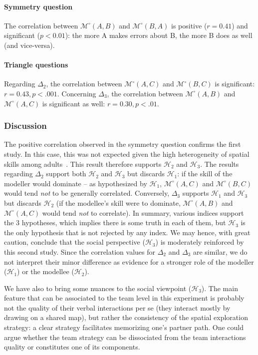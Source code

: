 \documentclass[natbib]{svjour3}
\newcommand{\A}{A\xspace}
\newcommand{\B}{B\xspace}
\newcommand{\gModel}[2]{{$\mathcal{M}^{\circ}(#1, #2)$}}
\begin{document}
\paragraph{Symmetry question} The correlation between \gModel{A}{B}  and
\gModel{B}{A}  is positive ($r = 0.41$) and significant ($p < 0.01$): the more \A
makes errors about \B, the more \B does as well (and vice-versa).

\paragraph{Triangle questions} Regarding $\Delta_2$, the correlation between
\gModel{A}{C} and \gModel{B}{C} is significant: $r=0.43, p <.001$. Concerning
$\Delta_3$, the correlation between \gModel{A}{B} and \gModel{A}{C} is
significant as well: $r=0.30, p <.01$.

\subsubsection*{Discussion}

The positive correlation observed in the symmetry question confirms the first
study.  In this case, this was not expected given the high heterogeneity of
spatial skills among adults~\citep{liben1981spatial}. This result therefore
supports  $\mathcal{H}_{2}$ and $\mathcal{H}_{3}$. The results regarding
$\Delta_2$ support both  $\mathcal{H}_{2}$ and  $\mathcal{H}_{3}$  but discards
$\mathcal{H}_{1}$: if the skill of the modeller would dominate -- as
hypothesized by $\mathcal{H}_{1}$, \gModel{A}{C}  and \gModel{B}{C} would tend
\emph{not} to be generally correlated.  Conversely, $\Delta_3$  supports
$\mathcal{H}_{1}$ and $\mathcal{H}_{3}$ but discards $\mathcal{H}_{2}$  (if the
modellee's skill were to dominate, \gModel{A}{B}  and \gModel{A}{C} would tend
\emph{not} to correlate). In summary, various indices support the 3 hypotheses,
which implies there is some truth in each of them, but $\mathcal{H}_{3}$ is the
only hypothesis that is not rejected by any index. We may hence, with great
caution, conclude that the social perspective ($\mathcal{H}_{3}$) is moderately
reinforced by this second study. Since the correlation values for $\Delta_2$ and
$\Delta_3$ are similar, we do not interpret their minor difference as evidence
for a stronger role of the modeller ($\mathcal{H}_{1}$) or the modellee
($\mathcal{H}_{2}$).

We have also to bring some nuances to the social viewpoint
($\mathcal{H}_{3}$).  The main feature that can be associated to the team level
in this experiment is probably not the quality of their verbal interactions per
se (they interact mostly by drawing on a shared map), but rather the consistency
of  the spatial exploration strategy: a clear strategy facilitates memorizing
one's partner path.  One could argue whether the team strategy can be
dissociated from the team interactions quality or constitutes one of its
components.
\end{document}
